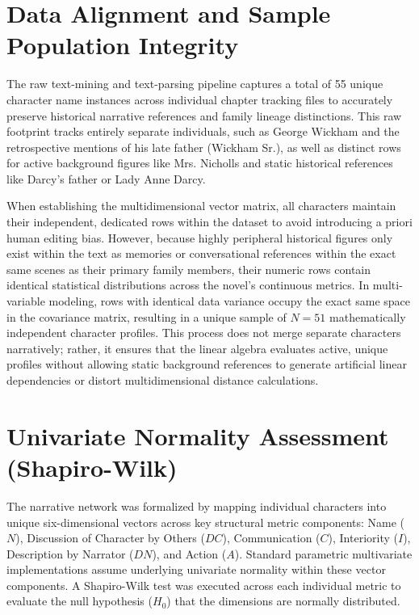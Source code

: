 \section{Data Alignment and Sample Population Integrity}
The raw text-mining and text-parsing pipeline captures a total of 55 unique character name instances across individual chapter tracking files to accurately preserve historical narrative references and family lineage distinctions. This raw footprint tracks entirely separate individuals, such as George Wickham and the retrospective mentions of his late father (Wickham Sr.), as well as distinct rows for active background figures like Mrs. Nicholls and static historical references like Darcy's father or Lady Anne Darcy. 

When establishing the multidimensional vector matrix, all characters maintain their independent, dedicated rows within the dataset to avoid introducing a priori human editing bias. However, because highly peripheral historical figures only exist within the text as memories or conversational references within the exact same scenes as their primary family members, their numeric rows contain identical statistical distributions across the novel's continuous metrics. In multi-variable modeling, rows with identical data variance occupy the exact same space in the covariance matrix, resulting in a unique sample of $N = 51$ mathematically independent character profiles. This process does not merge separate characters narratively; rather, it ensures that the linear algebra evaluates active, unique profiles without allowing static background references to generate artificial linear dependencies or distort multidimensional distance calculations.

\section{Univariate Normality Assessment (Shapiro-Wilk)}
The narrative network was formalized by mapping individual characters into unique six-dimensional vectors across key structural metric components: Name ($N$), Discussion of Character by Others ($DC$), Communication ($C$), Interiority ($I$), Description by Narrator ($DN$), and Action ($A$). Standard parametric multivariate implementations assume underlying univariate normality within these vector components. A Shapiro-Wilk test was executed across each individual metric to evaluate the null hypothesis ($H_0$) that the dimensions are normally distributed.

